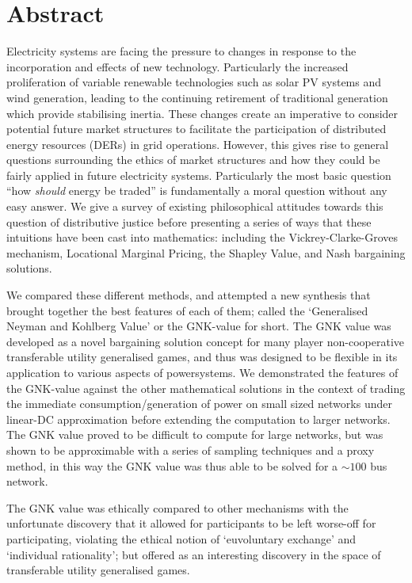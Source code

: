 \chapter*{Abstract}
\vspace{-1em}


Electricity systems are facing the pressure to changes in response to the incorporation and effects of new technology.
Particularly the increased proliferation of variable renewable technologies such as solar PV systems and wind generation, leading to the continuing retirement of traditional generation which provide stabilising inertia.
These changes create an imperative to consider potential future market structures to facilitate the participation of distributed energy resources (DERs) in grid operations.
However, this gives rise to general questions surrounding the ethics of market structures and how they could be fairly applied in future electricity systems. Particularly the most basic question ``how \textit{should} energy be traded'' is fundamentally a moral question without any easy answer.
We give a survey of existing philosophical attitudes towards this question of distributive justice before presenting a series of ways that these intuitions have been cast into mathematics: including the Vickrey-Clarke-Groves mechanism, Locational Marginal Pricing, the Shapley Value, and Nash bargaining solutions.

We compared these different methods, and attempted a new synthesis that brought together the best features of each of them; called the `Generalised Neyman and Kohlberg Value' or the GNK-value for short.
The GNK value was developed as a novel bargaining solution concept for many player non-cooperative transferable utility generalised games, and thus was designed to be flexible in its application to various aspects of powersystems.
We demonstrated the features of the GNK-value against the other mathematical solutions in the context of trading the immediate consumption/generation of power on small sized networks under linear-DC approximation before extending the computation to larger networks.
The GNK value proved to be difficult to compute for large networks, but was shown to be approximable with a series of sampling techniques and a proxy method, in this way the GNK value was thus able to be solved for a $\sim 100$ bus network.

The GNK value was ethically compared to other mechanisms with the unfortunate discovery that it allowed for participants to be left worse-off for participating, violating the ethical notion of `euvoluntary exchange' and `individual rationality'; but offered as an interesting discovery in the space of transferable utility generalised games.

